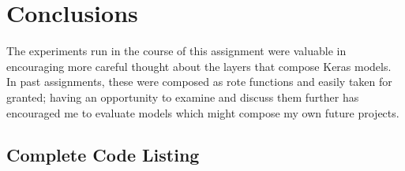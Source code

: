 \documentclass{article}
\begin{document}
\section{Conclusions}
The experiments run in the course of this assignment were valuable in encouraging more careful thought about the layers that compose Keras models.
In past assignments, these were composed as rote functions and easily taken for granted; having an opportunity to examine and discuss them further has encouraged me to evaluate models which might compose my own future projects.

\newpage
\begin{appendices}
\section{Complete Code Listing} \label{codelist}

\end{appendices}
\end{document}
